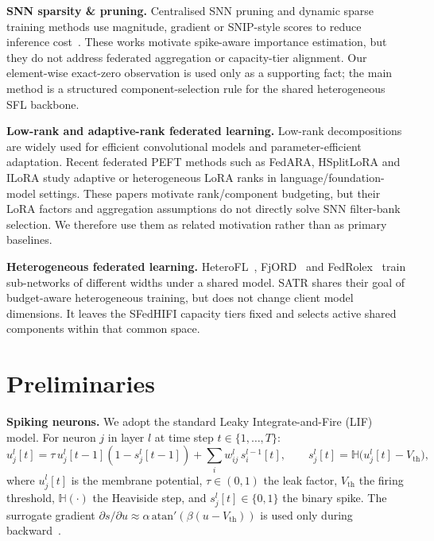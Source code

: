 \documentclass{article} %
\newcommand{\method}{SATR\xspace}
\begin{document}
\textbf{SNN sparsity \& pruning.} Centralised SNN pruning and dynamic sparse training methods use magnitude, gradient or SNIP-style scores to reduce inference cost~\citep{deng2021comprehensive, chen2021gradr, shen2023esl, su2024stds, yin2023mint}. These works motivate spike-aware importance estimation, but they do not address federated aggregation or capacity-tier alignment. Our element-wise exact-zero observation is used only as a supporting fact; the main method is a structured component-selection rule for the shared heterogeneous SFL backbone.

\textbf{Low-rank and adaptive-rank federated learning.} Low-rank decompositions are widely used for efficient convolutional models and parameter-efficient adaptation. Recent federated PEFT methods such as FedARA, HSplitLoRA and ILoRA study adaptive or heterogeneous LoRA ranks in language/foundation-model settings. These papers motivate rank/component budgeting, but their LoRA factors and aggregation assumptions do not directly solve SNN filter-bank selection. We therefore use them as related motivation rather than as primary baselines.

\textbf{Heterogeneous federated learning.} HeteroFL~\citep{diao2020heterofl}, FjORD~\citep{horvath2021fjord} and FedRolex~\citep{alam2022fedrolex} train sub-networks of different widths under a shared model. \method shares their goal of budget-aware heterogeneous training, but does not change client model dimensions. It leaves the SFedHIFI capacity tiers fixed and selects active shared components within that common space.

\section{Preliminaries}
\label{sec:prelim}

\textbf{Spiking neurons.} We adopt the standard Leaky Integrate-and-Fire (LIF) model. For neuron $j$ in layer $l$ at time step $t \in \{1,\dots,T\}$:
\begin{equation}
u_j^l[t] = \tau\, u_j^l[t-1] (1 - s_j^l[t-1]) + \sum_i w_{ij}^l\, s_i^{l-1}[t],\qquad s_j^l[t] = \mathbb{H}\big(u_j^l[t] - V_{\text{th}}\big),
\label{eq:lif}
\end{equation}
where $u_j^l[t]$ is the membrane potential, $\tau \in (0,1)$ the leak factor, $V_{\text{th}}$ the firing threshold, $\mathbb{H}(\cdot)$ the Heaviside step, and $s_j^l[t]\in\{0,1\}$ the binary spike. The surrogate gradient $\partial s/\partial u \approx \alpha\,\mathrm{atan}'(\beta(u-V_{\text{th}}))$ is used only during backward~\citep{neftci2019surrogate}.
\end{document}
